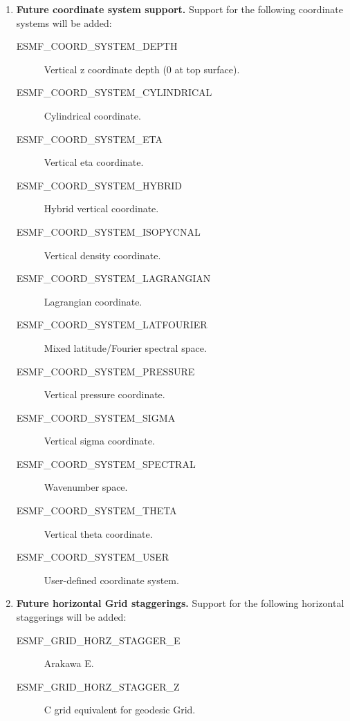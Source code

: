 \begin{enumerate}
\item {\bf Future coordinate system support.}  Support for the following
coordinate systems will be added:
 \begin{description}
    \item [ESMF\_COORD\_SYSTEM\_DEPTH]
          Vertical z coordinate depth (0 at top surface).
    \item [ESMF\_COORD\_SYSTEM\_CYLINDRICAL]
          Cylindrical coordinate.
    \item [ESMF\_COORD\_SYSTEM\_ETA]
          Vertical eta coordinate.
    \item [ESMF\_COORD\_SYSTEM\_HYBRID]
          Hybrid vertical coordinate.
    \item [ESMF\_COORD\_SYSTEM\_ISOPYCNAL]
          Vertical density coordinate.
    \item [ESMF\_COORD\_SYSTEM\_LAGRANGIAN]
          Lagrangian coordinate.
    \item [ESMF\_COORD\_SYSTEM\_LATFOURIER]
          Mixed latitude/Fourier spectral space.
    \item [ESMF\_COORD\_SYSTEM\_PRESSURE]
          Vertical pressure coordinate.
    \item [ESMF\_COORD\_SYSTEM\_SIGMA]
          Vertical sigma coordinate.
    \item [ESMF\_COORD\_SYSTEM\_SPECTRAL]
          Wavenumber space.
    \item [ESMF\_COORD\_SYSTEM\_THETA]
          Vertical theta coordinate.
    \item [ESMF\_COORD\_SYSTEM\_USER]
          User-defined coordinate system.
 \end{description}

\item {\bf Future horizontal Grid staggerings.}  Support for the following
horizontal staggerings will be added:
 \begin{description}
    \item [ESMF\_GRID\_HORZ\_STAGGER\_E]
          Arakawa E.
    \item [ESMF\_GRID\_HORZ\_STAGGER\_Z]
          C grid equivalent for geodesic Grid.
 \end{description}


\end{enumerate}
